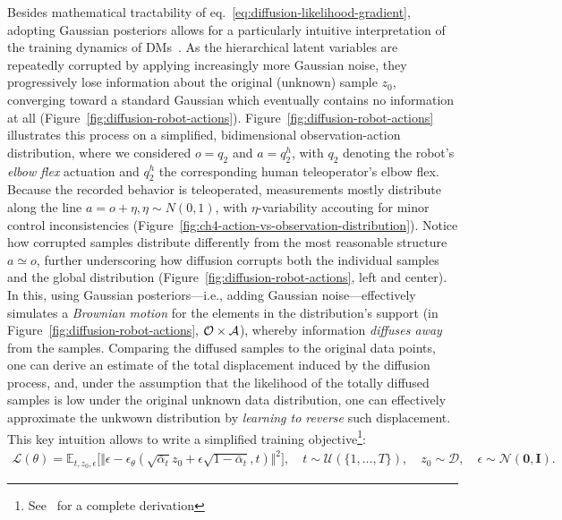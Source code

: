 Besides mathematical tractability of eq.~\ref{eq:diffusion-likelihood-gradient}, adopting Gaussian posteriors allows for a particularly intuitive interpretation of the training dynamics of DMs~\citep{permenterInterpretingImprovingDiffusion2024}. 
As the hierarchical latent variables are repeatedly corrupted by applying increasingly more Gaussian noise, they progressively lose information about the original (unknown) sample \( z_0 \), converging toward a standard Gaussian which eventually contains no information at all (Figure~\ref{fig:diffusion-robot-actions}).
Figure~\ref{fig:diffusion-robot-actions} illustrates this process on a simplified, bidimensional observation-action distribution, where we considered \( o=q_2 \) and \( a=q^h_2 \), with \( q_2 \) denoting the robot's \emph{elbow flex} actuation and \( q^h_2 \) the corresponding human teleoperator's elbow flex.
Because the recorded behavior is teleoperated, measurements mostly distribute along the line \( a = o + \eta, \eta \sim N(0,1) \), with \( \eta \)-variability accouting for minor control inconsistencies (Figure~\ref{fig:ch4-action-vs-observation-distribution}).
Notice how corrupted samples distribute differently from the most reasonable structure \( a \simeq o \), further underscoring how diffusion corrupts both the individual samples and the global distribution (Figure~\ref{fig:diffusion-robot-actions}, left and center).
In this, using Gaussian posteriors---i.e., adding Gaussian noise---effectively simulates a \emph{Brownian motion} for the elements in the distribution's support (in Figure~\ref{fig:diffusion-robot-actions}, \( \mathcal O \times \mathcal A \)), whereby information \emph{diffuses away} from the samples.
Comparing the diffused samples to the original data points, one can derive an estimate of the total displacement induced by the diffusion process, and, under the assumption that the likelihood of the totally diffused samples is low under the original unknown data distribution, one can effectively approximate the unkwown distribution by \emph{learning to reverse} such displacement.
This key intuition allows to write a simplified training objective\footnote{See~\citet["Three equivalent interpretations"]{luoUnderstandingDiffusionModels2022} for a complete derivation}:
\begin{align}\label{eq:diffusion-simplified-loss}
    \mathcal L(\theta) = \mathbb{E}_{t, z_0, \epsilon} \big[
        \Vert \epsilon - \epsilon_\theta(\sqrt{\bar \alpha_t} z_0 + \epsilon \sqrt{1 - \bar \alpha_t}, t) \Vert^2 \big], \quad t \sim \mathcal{U}(\{1,\dots,T\}), \quad
        z_0 \sim \mathcal{D}, \quad
        \epsilon \sim \mathcal{N}(\mathbf{0},\mathbf{I}).
\end{align}

